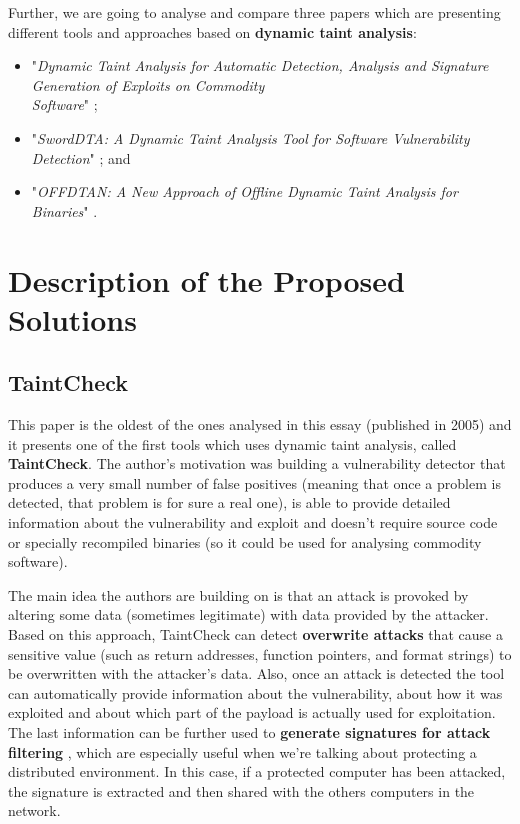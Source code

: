 \documentclass[10pt,a4paper,english,onecolumn]{IEEEtran}
\begin{document}
Further, we are going to analyse and compare three papers which are presenting different tools and approaches based on \textbf{dynamic taint analysis}:

\begin{itemize}
    \item "\textit{Dynamic Taint Analysis for Automatic Detection, Analysis and Signature Generation of Exploits on Commodity \\Software}" \cite{taintcheck};
    \item "\textit{SwordDTA: A Dynamic Taint Analysis Tool for Software Vulnerability Detection}" \cite{sworddta}; and
    \item "\textit{OFFDTAN: A New Approach of Offline Dynamic Taint Analysis for Binaries}" \cite{offdtan}.
\end{itemize}

\section{Description of the Proposed Solutions}

\subsection{TaintCheck}

This paper is the oldest of the ones analysed in this essay (published in 2005) and it presents one of the first tools which uses dynamic taint analysis, called \textbf{TaintCheck}. The author's motivation was building a vulnerability detector that produces a very small number of false positives (meaning that once a problem is detected, that problem is for sure a real one), is able to provide detailed information about the vulnerability and exploit and doesn't require source code or specially recompiled binaries (so it could be used for analysing commodity software).

The main idea the authors are building on is that an attack is provoked by altering some data (sometimes legitimate) with data provided by the attacker. Based on this approach, TaintCheck can detect \textbf{overwrite attacks} that cause a sensitive value (such as return addresses, function pointers, and format strings) to be overwritten with the attacker's data. Also, once an attack is detected the tool can automatically provide information about the vulnerability, about how it was exploited and about which part of the payload is actually used for exploitation. The last information can be further used to \textbf{generate signatures for attack filtering} , which are especially useful when we're talking about protecting a distributed environment. In this case, if a protected computer has been attacked, the signature is extracted and then shared with the others computers in the network.
\end{document}
